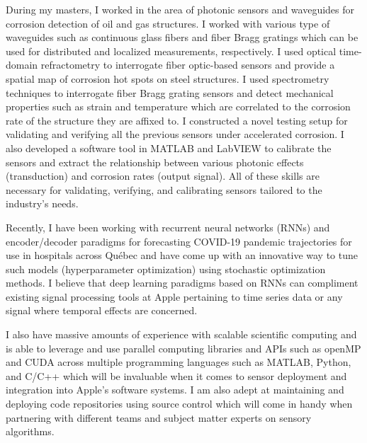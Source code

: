 \documentclass[12pt]{article} %
\begin{document}
\medskip %

During my masters, I worked in the area of photonic sensors and waveguides for corrosion detection of oil and gas structures. I worked with various type of waveguides such as continuous glass fibers and fiber Bragg gratings which can be used for distributed and localized measurements, respectively. I used optical time-domain refractometry to interrogate fiber optic-based sensors and provide a spatial map of corrosion hot spots on steel structures. I used spectrometry techniques to interrogate fiber Bragg grating sensors and detect mechanical properties such as strain and temperature which are correlated to the corrosion rate of the structure they are affixed to. I constructed a novel testing setup for validating and verifying all the previous sensors under accelerated corrosion. I also developed a software tool in MATLAB and LabVIEW to calibrate the sensors and extract the relationship between various photonic effects (transduction) and corrosion rates (output signal). All of these skills are necessary for validating, verifying, and calibrating sensors tailored to the industry's needs.

\medskip %

Recently, I have been working with recurrent neural networks (RNNs) and encoder/decoder paradigms for forecasting COVID-19 pandemic trajectories for use in hospitals across Qu{\'e}bec and have come up with an innovative way to tune such models (hyperparameter optimization) using stochastic optimization methods. I believe that deep learning paradigms based on RNNs can compliment existing signal processing tools at Apple pertaining to time series data or any signal where temporal effects are concerned. 

\medskip %

I also have massive amounts of experience with scalable scientific computing and is able to leverage and use parallel computing libraries and APIs such as openMP and CUDA across multiple programming languages such as MATLAB, Python, and C/C++ which will be invaluable when it comes to sensor deployment and integration into Apple's software systems. I am also adept at maintaining and deploying code repositories using source control which will come in handy when partnering with different teams and subject matter experts on sensory algorithms.

\medskip %
\end{document}
